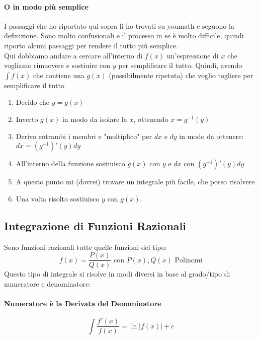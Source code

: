 \paragraph*{O in modo più semplice}
I passaggi che ho riportato qui sopra li ho trovati su youmath e seguono la definizione.
Sono molto confusionali e il processo in se è molto difficile, quindi riporto alcuni passaggi per rendere il tutto più semplice.
\\Qui dobbiamo andare a cercare all'interno di $f(x)$ un'espressione di $x$ che vogliamo rimuovere e sostiuire con $y$ per semplificare il tutto.
Quindi, avendo $\int f(x)$ che contiene una $g(x)$ (possibilmente ripetuta) che voglio togliere per semplificare il tutto
\begin{enumerate}
	\item Decido che $y=g(x)$
	\item Inverto $g(x)$ in modo da isolare la $x$, ottenendo $x=g^{-1}(y)$
	\item Derivo entrambi i membri e "moltiplico" per $dx$ e $dy$ in modo da ottenere: $dx=(g^{-1})'(y)dy$
	\item All'interno della funzione sostiuisco $g(x)$ con $y$ e $dx$ con $(g^{-1})'(y)dy$
	\item A questo punto mi (dovrei) trovare un integrale più facile, che posso risolvere
	\item Una volta risolto sostiuisco $y$ con $g(x)$.
\end{enumerate}

\subsection{Integrazione di Funzioni Razionali}
Sono funzioni razionali tutte quelle funzioni del tipo:
$$f(x)=\frac{P(x)}{Q(x)} \text{ con } P(x),Q(x) \text{ Polinomi} $$
Questo tipo di integrale si risolve in modi diversi in base al grado/tipo di numeratore e denominatore:
\paragraph*{Numeratore è la Derivata del Denominatore}
$$\int \frac{f'(x)}{f(x)} = \ln|f(x)|+ c$$
